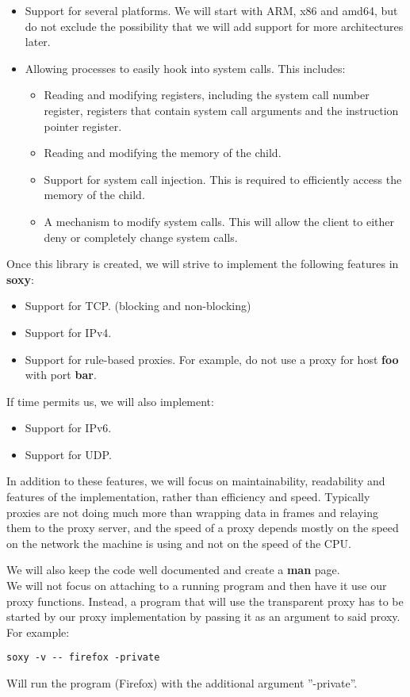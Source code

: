 \documentclass[a4paper]{article}
\begin{document}
\begin{itemize}
\item Support for several platforms. We will start with ARM, x86 and amd64, but
do not exclude the possibility that we will add support for more architectures
later.

\item Allowing processes to easily hook into system calls. This includes:
    \begin{itemize}
    \item Reading and modifying registers, including the system call number
    register, registers that contain system call arguments and the instruction
    pointer register.
    \item Reading and modifying the memory of the child.
    \item Support for system call injection. This is required to efficiently
    access the memory of the child.
    \item A mechanism to modify system calls. This will allow the client to
    either deny or completely change system calls.
    \end{itemize}
\end{itemize}

Once this library is created, we will strive to implement the following
features in \textbf{soxy}:

\begin{itemize}
\item Support for TCP. (blocking and non-blocking)
\item Support for IPv4.
\item Support for rule-based proxies. For example, do not use a proxy for
host \textbf{foo} with port \textbf{bar}.
\end{itemize}

If time permits us, we will also implement:

\begin{itemize}
\item Support for IPv6.
\item Support for UDP.
\end{itemize}

In addition to these features, we will focus on maintainability, readability
and features of the implementation, rather than efficiency and speed.
Typically proxies are not doing much more than wrapping data in frames and
relaying them to the proxy server, and the speed of a proxy depends mostly
on the speed on the network the machine is using and not on the speed of
the CPU.

We will also keep the code well documented and create a \textbf{man} page. \\

We will not focus on attaching to a running program and then have it use our
proxy functions. %
Instead, a program that will use the transparent proxy has to be started by our
proxy implementation by passing it as an argument to said proxy. For example:

\begin{verbatim}
soxy -v -- firefox -private
\end{verbatim}

Will run the program (Firefox) with the additional argument ''-private''.
\end{document}
